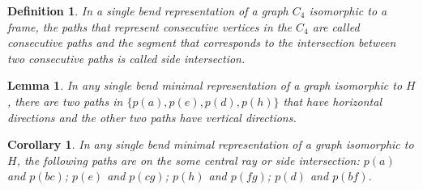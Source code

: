 \documentclass[9pt]{entcs}
\newtheorem{lema}{Lemma}[section]
\newtheorem{defi}{Definition}[section]
\newtheorem{coro}{Corollary}[section]
\newtheorem{prove}{Proof}[section]
\begin{document}
\begin{defi}
In a single bend representation of a graph $C_4$ isomorphic to a frame, the paths that represent consecutive vertices in the $C_4$ are called \emph{consecutive paths} and the segment that corresponds to the intersection between two consecutive paths is called \emph{side intersection}.  
\end{defi}

\begin{lema}\label{lem:2vertical2horizontal}
In any single bend minimal representation of a graph isomorphic to $H$, there are two paths in $\{p(a), p(e), p(d), p(h) \}$ that have horizontal directions and the other two paths have vertical directions.
\end{lema}




\begin{coro} \label{coro:paresMesmoSegmento}
In any single bend minimal representation of a graph isomorphic to $H$, the following paths are on the some central ray or side intersection: $p(a)$ and $p(bc)$; $p(e)$ and $p(cg)$; $p(h)$ and $p(fg)$; $p(d)$ and $p(bf)$.

\end{coro}
\end{document}

